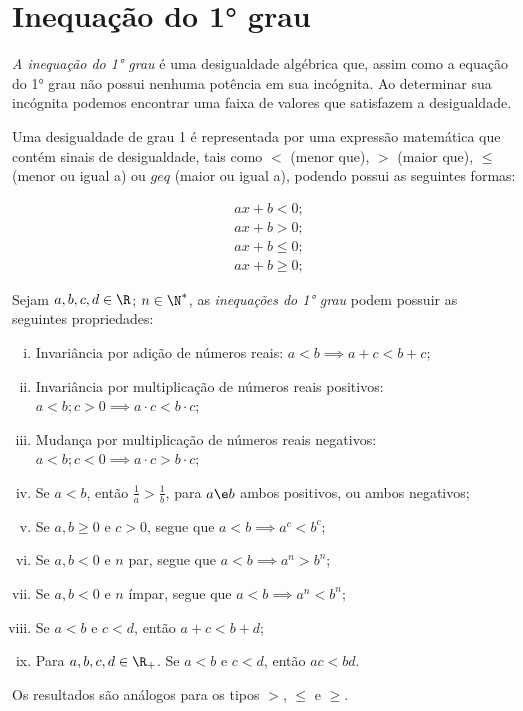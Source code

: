 \section{Inequação do 1° grau}

\emph{A inequação do 1° grau} é uma desigualdade algébrica que, assim como a equação do 1° grau não possui nenhuma potência em sua incógnita. Ao determinar sua incógnita podemos encontrar uma faixa de valores que satisfazem a desigualdade.

Uma desigualdade de grau 1 é representada por uma expressão matemática que contém sinais de desigualdade, tais como $<$ (menor que), $>$ (maior que), $\leq$  (menor ou igual a) ou $geq$ (maior ou igual a), podendo possui as seguintes formas:

\begin{align*}
    & ax+b <0;\\
    & ax+b >0;\\
    & ax+b \le 0;\\
    & ax+b \ge 0;
\end{align*}


Sejam $a, b, c, d \in \R$; $n \in \N^*$, as \emph{inequações do 1° grau} podem possuir as seguintes propriedades:

\begin{enumerate}[i.]
    \item Invariância por adição de números reais: $a < b \implies a+c < b+c$;
    \item Invariância por multiplicação de números reais positivos:  $a < b ; c>0 \implies a \cdot c < b \cdot c$;
    \item Mudança por multiplicação de números reais negativos: $a < b ; c<0 \implies a \cdot c > b \cdot c$;
    \item Se $a < b$, então $\frac 1 a > \frac 1 b$, para $a \e b$ ambos positivos, ou ambos negativos;
    \item Se $a,b \geq 0$ e $c>0$, segue que $a < b \implies a^c < b^c$;
    \item Se $a,b < 0$ e $n$ par, segue que $a < b \implies a^n > b^n$;
    \item Se $a,b < 0$ e $n$ ímpar, segue que $a < b \implies a^n < b^n$;
    \item Se $a< b$ e $c< d$, então $a+c < b+d$;
    \item Para $a, b, c, d \in \R_+$. Se $a< b$ e $c< d$, então $ac < bd$.
\end{enumerate}

Os resultados são análogos para os tipos $>$, $\leq$ e $\geq$.
